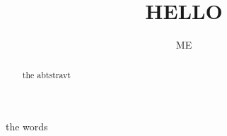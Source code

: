 \documentclass{ximera}
\title{HELLO}
\author{ME}
\begin{document}
\begin{abstract}
the abtstravt
\end{abstract}
\maketitle

the words
\end{document}
